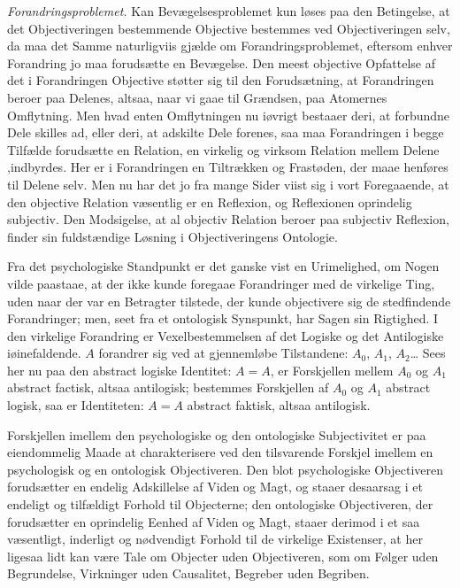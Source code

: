 \documentclass[11pt]{book}
\newcommand{\opage}[1]{\marginnote{\footnotesize\textit{[#1]}}}
\begin{document}
\emph{Forandringsproblemet.} Kan Bevægelsesproblemet kun løses paa
den Betingelse, at det Objectiveringen bestemmende Objective bestemmes
ved Objectiveringen selv, da maa det Samme naturligviis gjælde om
Forandringsproblemet, eftersom enhver Forandring jo maa forudsætte en
Bevægelse. Den meest objective Opfattelse af det i Forandringen
Objective støtter sig til den Forudsætning, at Forandringen beroer paa
Delenes, altsaa, naar vi gaae til Grændsen, paa Atomernes Omflytning.
Men hvad enten Omflytningen nu iøvrigt bestaaer deri, at forbundne
Dele skilles ad, eller deri, at adskilte Dele forenes, saa maa
Forandringen i begge Tilfælde forudsætte en Relation, en virkelig og
virksom Relation mellem Delene ,indbyrdes. %
Her er i Forandringen en Tiltrækken og Frastøden, der maae henføres
til Delene selv. Men nu har det jo fra mange Sider viist sig i vort
Foregaaende, at den objective Relation væsentlig er en Reflexion, og
Reflexionen oprindelig subjectiv. Den Modsigelse, at al objectiv
Relation beroer paa subjectiv Reflexion, finder sin fuldstændige
Løsning i Objectiveringens Ontologie.

Fra det psychologiske Standpunkt er det ganske vist en Urimelighed, om
Nogen vilde paastaae, at der ikke kunde foregaae Forandringer med de
virkelige Ting, uden naar der var en Betragter tilstede, der kunde
objectivere sig de stedfindende Forandringer; men, seet fra et
ontologisk Synspunkt, har Sagen sin Rigtighed. I den virkelige
Forandring er Vexelbestemmelsen af det Logiske og det Antilogiske
iøinefaldende. $A$ forandrer sig ved at gjennemløbe Tilstandene:
$A_0$, $A_1$, $A_2$\dots{} Sees her nu paa den abstract logiske
Identitet: $A = A$, er Forskjellen mellem $A_0$ og $A_1$ abstract
factisk, altsaa antilogisk; bestemmes Forskjellen af $A_0$ og $A_1$
abstract logisk, saa er Identiteten: $A = A$ abstract faktisk, altsaa
antilogisk.

\opage{175} \setcounter{footnote}{0}%
Forskjellen imellem den psychologiske og den ontologiske
Subjectivitet er paa eiendommelig Maade at charakterisere ved
den tilsvarende Forskjel imellem en psychologisk og en ontologisk
Objectiveren. Den blot psychologiske Objectiveren forudsætter en
endelig Adskillelse af Viden og Magt, og staaer desaarsag i et
endeligt og tilfældigt Forhold til Objecterne; den ontologiske
Objectiveren, der forudsætter en oprindelig Eenhed af Viden og
Magt, staaer derimod i et saa væsentligt, inderligt og nødvendigt
Forhold til de virkelige Existenser, at her ligesaa lidt kan være
Tale om Objecter uden Objectiveren, som om Følger uden
Begrundelse, Virkninger uden Causalitet, Begreber uden Begriben.
\end{document}
